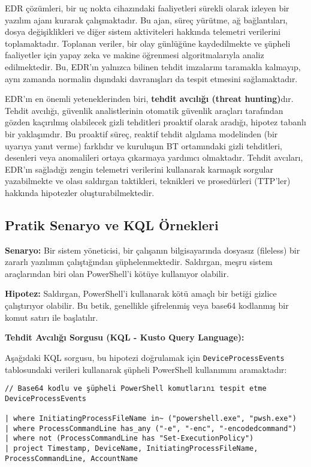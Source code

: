 EDR çözümleri, bir uç nokta cihazındaki faaliyetleri sürekli olarak izleyen bir yazılım ajanı kurarak çalışmaktadır. Bu ajan, süreç yürütme, ağ bağlantıları, dosya değişiklikleri ve diğer sistem aktiviteleri hakkında telemetri verilerini toplamaktadır. Toplanan veriler, bir olay günlüğüne kaydedilmekte ve şüpheli faaliyetler için yapay zeka ve makine öğrenmesi algoritmalarıyla analiz edilmektedir. Bu, EDR'ın yalnızca bilinen tehdit imzalarını taramakla kalmayıp, aynı zamanda normalin dışındaki davranışları da tespit etmesini sağlamaktadır.

EDR'ın en önemli yeteneklerinden biri, \textbf{tehdit avcılığı (threat hunting)}dır. Tehdit avcılığı, güvenlik analistlerinin otomatik güvenlik araçları tarafından gözden kaçırılmış olabilecek gizli tehditleri proaktif olarak aradığı, hipotez tabanlı bir yaklaşımdır. Bu proaktif süreç, reaktif tehdit algılama modelinden (bir uyarıya yanıt verme) farklıdır ve kuruluşun BT ortamındaki gizli tehditleri, desenleri veya anomalileri ortaya çıkarmaya yardımcı olmaktadır. Tehdit avcıları, EDR'ın sağladığı zengin telemetri verilerini kullanarak karmaşık sorgular yazabilmekte ve olası saldırgan taktikleri, teknikleri ve prosedürleri (TTP'ler) hakkında hipotezler oluşturabilmektedir.

\subsection{Pratik Senaryo ve KQL Örnekleri}
\textbf{Senaryo:} Bir sistem yöneticisi, bir çalışanın bilgisayarında dosyasız (fileless) bir zararlı yazılımın çalıştığından şüphelenmektedir. Saldırgan, meşru sistem araçlarından biri olan PowerShell'i kötüye kullanıyor olabilir.

\textbf{Hipotez:} Saldırgan, PowerShell'i kullanarak kötü amaçlı bir betiği gizlice çalıştırıyor olabilir. Bu betik, genellikle şifrelenmiş veya base64 kodlanmış bir komut satırı ile başlatılır.

\textbf{Tehdit Avcılığı Sorgusu (KQL - Kusto Query Language):}

Aşağıdaki KQL sorgusu, bu hipotezi doğrulamak için \texttt{DeviceProcessEvents} tablosundaki verileri kullanarak şüpheli PowerShell kullanımını aramaktadır:

\begin{verbatim}
// Base64 kodlu ve şüpheli PowerShell komutlarını tespit etme
DeviceProcessEvents

| where InitiatingProcessFileName in~ ("powershell.exe", "pwsh.exe")
| where ProcessCommandLine has_any ("-e", "-enc", "-encodedcommand")
| where not (ProcessCommandLine has "Set-ExecutionPolicy")
| project Timestamp, DeviceName, InitiatingProcessFileName, ProcessCommandLine, AccountName
\end{verbatim}

